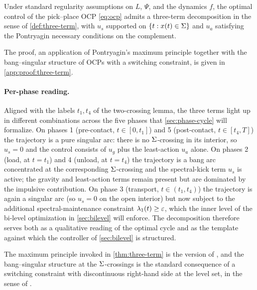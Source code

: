 \begin{theorem}\label{thm:three-term}
Under standard regularity assumptions on $L$, $\Psi$, and the
dynamics $f$, the optimal control of the pick--place OCP
\eqref{eq:ocp} admits a three-term decomposition in the sense
of \cref{def:three-term}, with $u_{s}$ supported on
$\{t : x(t) \in \Sigma\}$ and $u_{a}$ satisfying the
Pontryagin necessary conditions on the complement.
\end{theorem}

The proof, an application of Pontryagin's maximum principle
together with the bang--singular structure of OCPs with a
switching constraint, is given in
\cref{app:proof:three-term}.

\paragraph{Per-phase reading.}
Aligned with the labels $t_{1}, t_{4}$ of the two-crossing
lemma, the three terms light up in different combinations
across the five phases that \cref{sec:phase-cycle} will
formalize. On phases 1 (pre-contact, $t \in [0, t_{1}]$) and 5
(post-contact, $t \in [t_{4}, T]$) the trajectory is a pure
singular arc: there is no $\Sigma$-crossing in its interior,
so $u_{s} = 0$ and the control consists of $u_{g}$ plus the
least-action $u_{a}$ alone. On phases 2 (load, at $t = t_{1}$)
and 4 (unload, at $t = t_{4}$) the trajectory is a bang arc
concentrated at the corresponding $\Sigma$-crossing and the
spectral-kick term $u_{s}$ is active; the gravity and
least-action terms remain present but are dominated by the
impulsive contribution. On phase 3 (transport, $t \in (t_{1},
t_{4})$) the trajectory is again a singular arc (so $u_{s} =
0$ on the open interior) but now subject to the additional
spectral-maintenance constraint $\lambda_{1}(t) \ge \varepsilon$,
which the inner level of the bi-level optimization in
\cref{sec:bilevel} will enforce. The decomposition therefore
serves both as a qualitative reading of the optimal cycle and
as the template against which the controller of
\cref{sec:bilevel} is structured.

The maximum principle invoked in
\cref{thm:three-term} is the version of
\citet{Pontryagin1962}, and the bang--singular structure at the
$\Sigma$-crossings is the standard consequence of a switching
constraint with discontinuous right-hand side at the level set,
in the sense of \citet{BrysonHo1975}.

